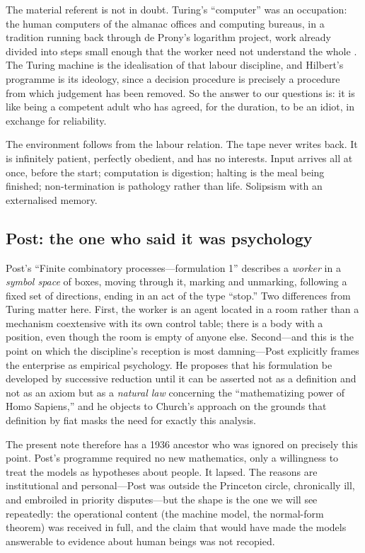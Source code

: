 \documentclass[11pt,a4paper]{article}
\begin{document}
The material referent is not in doubt. Turing's ``computer'' was an occupation:
the human computers of the almanac offices and computing bureaus, in a tradition
running back through de Prony's logarithm project, work already divided into
steps small enough that the worker need not understand the whole
\cite{grier2005,daston1994}. The Turing machine is the idealisation of that
labour discipline, and Hilbert's programme is its ideology, since a decision
procedure is precisely a procedure from which judgement has been removed. So the
answer to our questions is: it is like being a competent adult who has agreed,
for the duration, to be an idiot, in exchange for reliability.

The environment follows from the labour relation. The tape never writes back. It
is infinitely patient, perfectly obedient, and has no interests. Input arrives all
at once, before the start; computation is digestion; halting is the meal being
finished; non-termination is pathology rather than life. Solipsism with an
externalised memory.

\subsection{Post: the one who said it was psychology}

Post's ``Finite combinatory processes---formulation 1'' \cite{post1936} describes
a \emph{worker} in a \emph{symbol space} of boxes, moving through it, marking and
unmarking, following a fixed set of directions, ending in an act of the type
``stop.'' Two differences from Turing matter here. First, the worker is an agent
located in a room rather than a mechanism coextensive with its own control table;
there is a body with a position, even though the room is empty of anyone else.
Second---and this is the point on which the discipline's reception is most
damning---Post explicitly frames the enterprise as empirical psychology. He
proposes that his formulation be developed by successive reduction until it can be
asserted not as a definition and not as an axiom but as a \emph{natural law}
concerning the ``mathematizing power of Homo Sapiens,'' and he objects to
Church's approach on the grounds that definition by fiat masks the need for
exactly this analysis.

The present note therefore has a 1936 ancestor who was ignored on precisely this
point. Post's programme required no new mathematics, only a willingness to treat
the models as hypotheses about people. It lapsed. The reasons are institutional
and personal---Post was outside the Princeton circle, chronically ill, and
embroiled in priority disputes---but the shape is the one we will see repeatedly:
the operational content (the machine model, the normal-form theorem) was received
in full, and the claim that would have made the models answerable to evidence
about human beings was not recopied.
\end{document}
